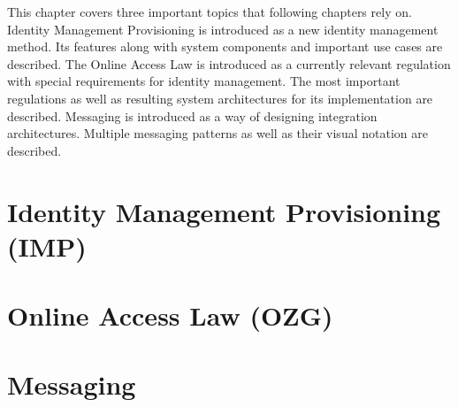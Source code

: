 This chapter covers three important topics that following chapters rely on.
Identity Management Provisioning is introduced as a new identity management method. Its features along with system components and important use cases are described. 
The Online Access Law is introduced as a currently relevant regulation with special requirements for identity management. The most important regulations as well as resulting system architectures for its implementation are described.
Messaging is introduced as a way of designing integration architectures. Multiple messaging patterns as well as their visual notation are described.

\section{Identity Management Provisioning (IMP)}


\section{Online Access Law (OZG)}


\section{Messaging}
